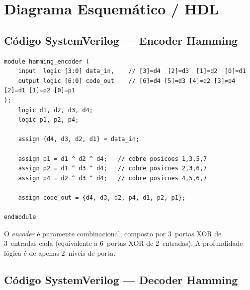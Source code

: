 \documentclass[12pt,a4paper]{article}
\begin{document}
\section{Diagrama Esquemático / HDL}

\subsection{Código SystemVerilog --- Encoder Hamming}

\begin{lstlisting}[style=svstyle,caption={hamming\_encoder.sv --- Codificador combinacional 4$\to$7 bits},label=lst:encoder]
module hamming_encoder (
    input  logic [3:0] data_in,    // [3]=d4  [2]=d3  [1]=d2  [0]=d1
    output logic [6:0] code_out    // [6]=d4 [5]=d3 [4]=d2 [3]=p4 [2]=d1 [1]=p2 [0]=p1
);
    logic d1, d2, d3, d4;
    logic p1, p2, p4;

    assign {d4, d3, d2, d1} = data_in;

    assign p1 = d1 ^ d2 ^ d4;   // cobre posicoes 1,3,5,7
    assign p2 = d1 ^ d3 ^ d4;   // cobre posicoes 2,3,6,7
    assign p4 = d2 ^ d3 ^ d4;   // cobre posicoes 4,5,6,7

    assign code_out = {d4, d3, d2, p4, d1, p2, p1};

endmodule
\end{lstlisting}

O \textit{encoder} é puramente combinacional, composto por 3~portas XOR de 3~entradas cada (equivalente a 6~portas XOR de 2~entradas). A profundidade lógica é de apenas 2~níveis de porta.

\subsection{Código SystemVerilog --- Decoder Hamming}
\end{document}
